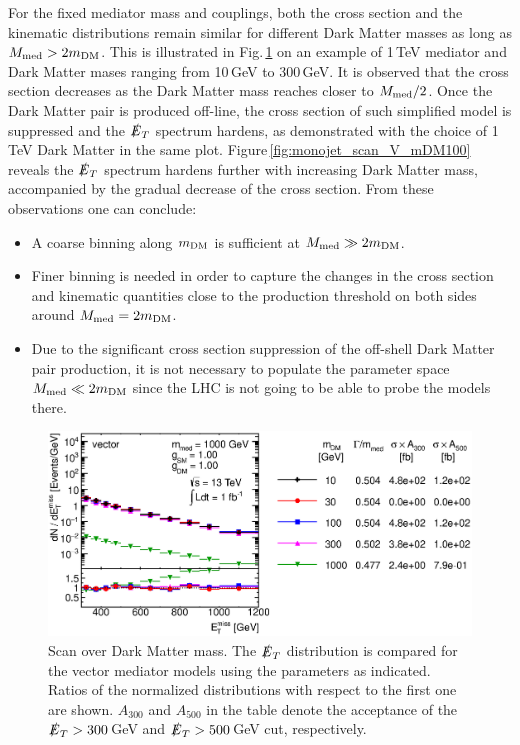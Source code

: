 For the fixed mediator mass and couplings, both the cross section and the kinematic distributions remain similar for different Dark Matter masses as long as $M_{\rm{med}}>2m_{\rm{DM}}$. This is illustrated in Fig.\,\ref{fig:monojet_scan_V_mDM1000} on an example of 1\,TeV mediator and Dark Matter mases ranging from 10\,GeV to 300\,GeV. It is observed that the cross section decreases as the Dark Matter mass reaches closer to $M_{\rm{med}}/2$. Once the Dark Matter pair is produced off-line, the cross section of such simplified model is suppressed and the $\slashed{E}_T$ spectrum hardens, as demonstrated with the choice of 1\,TeV Dark Matter in the same plot. Figure\,\ref{fig:monojet_scan_V_mDM100} reveals the $\slashed{E}_T$ spectrum hardens further with increasing Dark Matter mass, accompanied by the gradual decrease of the cross section. From these observations one can conclude:
\begin{itemize}
\item A coarse binning along $m_{\rm{DM}}$ is sufficient at $M_{\rm{med}} \gg 2m_{\rm{DM}}$.
\item Finer binning is needed in order to capture the changes in the cross section and kinematic quantities close to the production threshold on both sides around $M_{\rm{med}}=2m_{\rm{DM}}$.
\item Due to the significant cross section suppression of the off-shell Dark Matter pair production, it is not necessary to populate the parameter space $M_{\rm{med}} \ll 2m_{\rm{DM}}$ since the LHC is not going to be able to probe the models there.
\end{itemize}

\begin{figure}
\centering
\includegraphics[width=0.9\linewidth]{figures/monojet/scan_mDM_V_1000.eps}
\caption{Scan over Dark Matter mass. The $\slashed{E}_T$ distribution is compared for the vector mediator models using the parameters as indicated. Ratios of the normalized distributions with respect to the first one are shown. $A_{300}$ and $A_{500}$ in the table denote the acceptance of the $\slashed{E}_T>300$\,GeV and $\slashed{E}_T>500$\,GeV cut, respectively.}
\label{fig:monojet_scan_V_mDM1000}
\end{figure}

